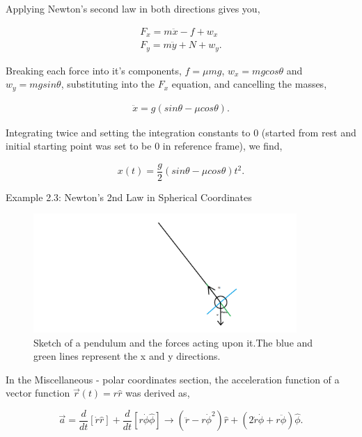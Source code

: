 Applying Newton's second law in both directions gives you,

\begin{align*}
    F_x = m \ddot x - f + w_x \\
    F_y = m \ddot y + N + w_y.
\end{align*}

\noindent Breaking each force into it's components, $f = \mu mg$, $w_x = mg cos\theta$ and $w_y = mg sin\theta$, substituting into the $F_x$ equation, and cancelling the masses,

\begin{align*}
    \ddot x = g(sin\theta - \mu cos\theta).
\end{align*}

\noindent Integrating twice and setting the integration constants to 0 (started from rest and initial starting point was set to be 0 in reference frame), we find,

\begin{equation}
    x(t) = \frac{g}{2} (sin\theta - \mu cos \theta) t^2.
\end{equation}

{\exend }

{\exbegin Example 2.3: Newton's 2nd Law in Spherical Coordinates}

\begin{figure}
    \centering
    \includegraphics[width=10cm]{Classical_Mechanics/2.2-Newton/ex-pendulum-fig2.png}
    \caption{Sketch of a pendulum and the forces acting upon it.The blue and green lines represent the x and y directions.}
    \label{fig:ex-pendulum-fig}
\end{figure}

In the Miscellaneous - polar coordinates section, the acceleration function of a vector function $ \vec{r}(t) = r\hat{r} $ was derived as,

\begin{equation}
    \label{eqn:polar-coord-newtons-2nd}
    \vec{a} = \frac{d}{dt}[\dot r \hat r] + \frac{d}{dt}[r \dot \phi \hat \phi] \rightarrow (\ddot r - r \dot \phi^2) \hat r + (2\dot r \dot \phi + r \ddot \phi) \hat \phi.
\end{equation}

